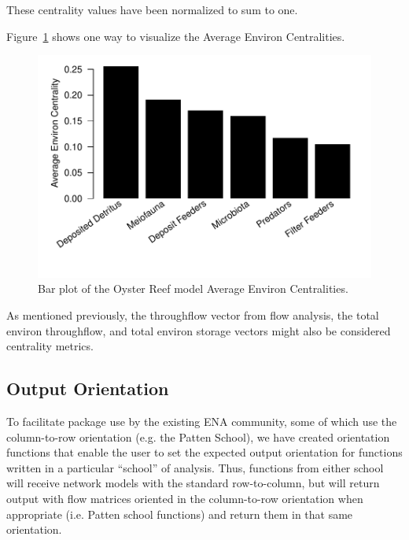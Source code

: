 \documentclass[article]{jss}
\begin{document}
These centrality values have been normalized to sum to one.

Figure~\ref{fig:aec} shows one way to visualize the Average Environ
Centralities.


\begin{Schunk}
\end{Schunk}

\begin{figure}
  \center
\includegraphics{enaR-vignette-043}
\caption{Bar plot of the Oyster Reef model Average Environ
  Centralities.} \label{fig:aec}
\end{figure}

As mentioned previously, the throughflow vector from flow analysis,
the total environ throughflow, and total environ storage vectors might
also be considered centrality metrics.

\subsection{Output Orientation}  \label{sec:orient}

To facilitate package use by the existing ENA community, some of which
use the column-to-row orientation (e.g. the Patten School), we have
created orientation functions that enable the user to set the expected
output orientation for functions written in a particular ``school'' of
analysis. Thus, functions from either school will receive network
models with the standard row-to-column, but will return output with
flow matrices oriented in the column-to-row orientation when
appropriate (i.e. Patten school functions) and return them in that
same orientation.
\end{document}
